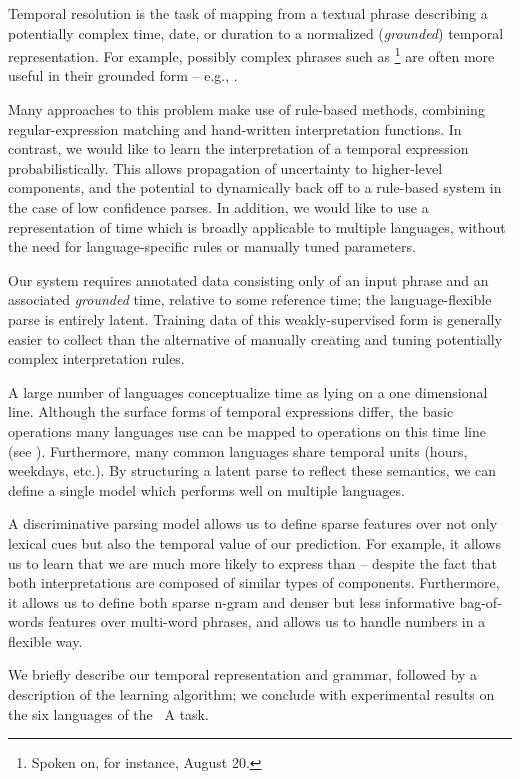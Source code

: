 Temporal resolution is the task of mapping from a textual phrase describing
	a potentially complex time, date, or duration to a normalized
	(\textit{grounded}) temporal representation.
For example, possibly complex phrases such as
  \footnote{
    Spoken on, for instance, August 20.
  } are
	often more useful in their grounded form
  -- e.g., .

Many approaches to this problem make use of rule-based methods, combining
  regular-expression matching and hand-written interpretation functions.
In contrast, we would like to learn the interpretation of a
  temporal expression probabilistically.
This allows propagation of uncertainty
	to higher-level components, and the potential to dynamically back off to
  a rule-based system in the case of low confidence parses.
In addition, we would like to use a representation of time which is
  broadly applicable to multiple languages, without the need for
  language-specific rules or manually tuned parameters.

Our system requires annotated data consisting only of an input phrase and
  an associated \textit{grounded} time, relative to some reference time;
  the language-flexible parse is entirely latent.
Training data of this weakly-supervised form
  is generally easier to collect than the alternative of
  manually creating and tuning potentially complex interpretation rules.

A large number of languages conceptualize time as lying on a one dimensional
  line.
Although the surface forms of temporal expressions differ, the basic operations
  many languages use can be mapped to operations on this
  time line (see ).
Furthermore, many common languages share temporal units (hours, weekdays, etc.).
By structuring a latent parse to reflect these semantics, we can define a single
  model which performs well on multiple languages.

A discriminative parsing model allows us to define sparse features
  over not only lexical cues but also the temporal value of our prediction.
For example, it allows us to learn that we are much more likely to
  express  than  -- despite the fact that
  both interpretations are composed of similar types of components.
Furthermore, it allows us to define both sparse n-gram and denser but less
  informative bag-of-words features over multi-word phrases, and allows us
  to handle numbers in a flexible way.

We briefly describe our temporal representation and grammar,
	followed by a description of the learning algorithm; 
	we conclude with experimental results on the six languages of the
  \tempeval\ A task.




